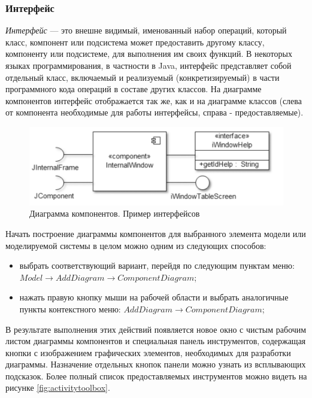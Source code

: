 \documentclass[a4paper,12pt]{report}
\begin{document}
\subsubsection*{Интерфейс}
\textit{Интерфейс} --- это внешне видимый, именованный набор операций, который класс, компонент или подсистема может предоставить другому классу, компоненту или подсистеме, для выполнения им своих функций. В некоторых языках программирования, в частности в Java, интерфейс представляет собой отдельный класс, включаемый и реализуемый (конкретизируемый) в части программного кода операций в составе других классов. На диаграмме компонентов интерфейс отображается так же, как и на диаграмме классов (слева от компонента необходимые для работы интерфейсы, справа - предоставляемые).
\begin{figure}[h!]
	\centering
	\includegraphics[width=0.6\linewidth]{images/componentsinterface}
	\caption{Диаграмма компонентов. Пример интерфейсов}
	\label{fig:componentsinterface}
\end{figure}



Начать построение диаграммы компонентов для выбранного элемента модели или моделируемой системы в целом можно одним из следующих способов:
\begin{itemize}
	\item выбрать соответствующий вариант, перейдя по следующим пунктам меню: \\$Model \to Add Diagram \to Component Diagram$;
	\item нажать правую кнопку мыши на рабочей области и выбрать аналогичные пункты контекстного меню: $Add Diagram \to Component Diagram$;
\end{itemize}

В результате выполнения этих действий появляется новое окно с чистым рабочим листом диаграммы компонентов и специальная панель инструментов, содержащая кнопки с изображением графических элементов, необходимых для разработки диаграммы. Назначение отдельных кнопок панели можно узнать из всплывающих подсказок. Более полный список предоставляемых инструментов можно видеть на рисунке \ref{fig:activitytoolbox}.
\end{document}
